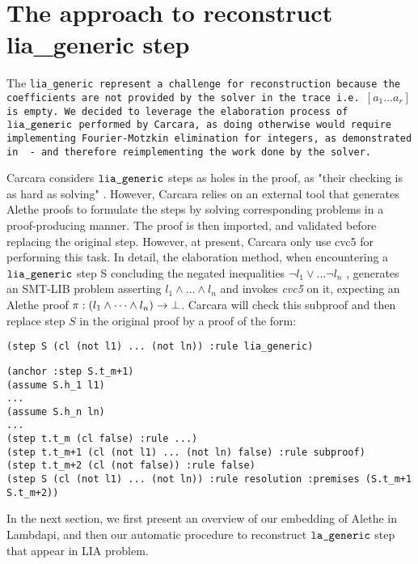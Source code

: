 \section{The approach to reconstruct lia\_generic step}

The \tt{lia\_generic} represent a challenge for reconstruction because the coefficients are not provided by the solver in the trace i.e. \colorbox{orange!30}{$[a_1 \dots a_r]$} is empty.
We decided to leverage the elaboration process of $\tt{lia\_generic}$ performed by Carcara, as doing otherwise would require implementing Fourier-Motzkin elimination for integers, as demonstrated in \cite{omegatest,micromega} -
and therefore reimplementing the work done by the solver.

Carcara considers $\tt{lia\_generic}$ steps as holes in the proof,  as "their checking is as hard as solving" \cite[\S 3.2]{carcara}.
However, Carcara relies on an external tool that generates Alethe proofs to formulate the steps by solving corresponding problems in a proof-producing manner.
The proof is then imported, and validated before replacing the original step. However, at present, Carcara only use cvc5 for performing this task.
In detail, the elaboration method, when encountering a $\tt{lia\_generic}$ step S concluding the negated inequalities $ \neg l_1 \lor \dots \neg l_n$ , generates an SMT-LIB problem asserting $l_1 \land \dots \land l_n$ and invokes \emph{cvc5} on it, expecting an Alethe proof $\pi : (l_1 \land \dots \land l_n) \ra \bot$.
Carcara will check this subproof and then replace step $S$ in the original proof by a proof of the form:

\begin{lstlisting}[language=SMT]
(step S (cl (not l1) ... (not ln)) :rule lia_generic)
\end{lstlisting}

\begin{center}
\lightning
\end{center}

\begin{lstlisting}[language=SMT,caption={Elaboration of $\tt{lia\_generic}$},label={lst:elab_lia}]
(anchor :step S.t_m+1)
(assume S.h_1 l1)
...
(assume S.h_n ln)
...
(step t.t_m (cl false) :rule ...)
(step t.t_m+1 (cl (not l1) ... (not ln) false) :rule subproof)
(step t.t_m+2 (cl (not false)) :rule false)
(step S (cl (not l1) ... (not ln)) :rule resolution :premises (S.t_m+1 S.t_m+2))
\end{lstlisting}

In the next section, we first present an overview of our embedding of Alethe in Lambdapi, and then our automatic procedure to reconstruct $\tt{la\_generic}$ step that appear in LIA problem.
